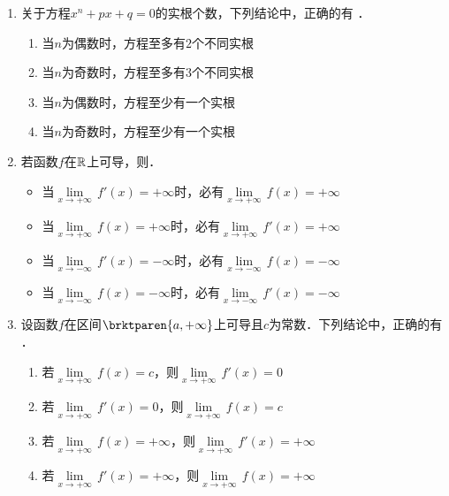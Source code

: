 \documentclass[a4paper,punct=CCT]{ctexbook}
\renewcommand*{\enumparen}[1]{（\makebox[0.6em][c]{\normalfont#1}）}
\theoremstyle{definition}
\theoremstyle{remark}
\newif\ifshowsol
\begin{document}
\begin{enumerate}
\item 关于方程\(x^n + px + q = 0\)的实根个数，下列结论中，正确的有\ifshowsol
  \uline{\makebox[6em]{\enumparen{1}\enumparen{2}\enumparen{4}}}．
  \else
  \uline{\hspace{6em}}．
  \fi
  \begin{enumerate}
    \renewcommand{\labelenumii}{\enumparen{\arabic{enumii}}}
  \item 当\(n\)为偶数时，方程至多有\(2\)个不同实根
  \item 当\(n\)为奇数时，方程至多有\(3\)个不同实根
  \item 当\(n\)为偶数时，方程至少有一个实根
  \item 当\(n\)为奇数时，方程至少有一个实根
  \end{enumerate}

\item 若函数\(f\)在\(\mathbb{R}\)上可导，则\uline{\hspace{10em}}．
  \begin{itemize}
    \renewcommand{\labelitemi}{\faCircleThin}
    \ifshowsol
  \item[\faCircle]
    \else
  \item
    \fi
    当\(\!\lim\limits_{x\to+\infty}\,f'(x) = +\infty\)时，必有\(\!\lim\limits_{x\to+\infty}\,f(x) = +\infty\)
  \item 当\(\!\lim\limits_{x\to+\infty}\,f(x) = +\infty\)时，必有\(\!\lim\limits_{x\to+\infty}\,f'(x) = +\infty\)
  \item 当\(\!\lim\limits_{x\to-\infty}\,f'(x) = -\infty\)时，必有\(\!\lim\limits_{x\to-\infty}\,f(x) = -\infty\)
  \item 当\(\!\lim\limits_{x\to-\infty}\,f(x) = -\infty\)时，必有\(\!\lim\limits_{x\to-\infty}\,f'(x) = -\infty\)
  \end{itemize}

\item 设函数\(f\)在区间\(\brktparen{a,+\infty}\)上可导且\(c\)为常数．下列结论中，正确的有\ifshowsol
  \uline{\makebox[6em]{\enumparen{4}}}．
  \else
  \uline{\hspace{6em}}．
  \fi
  \begin{enumerate}
    \renewcommand{\labelenumii}{\enumparen{\arabic{enumii}}}
  \item 若\(\!\lim\limits_{x\to+\infty}\,f(x) = c\)，则\(\!\lim\limits_{x\to+\infty}\,f'(x) = 0\)
  \item 若\(\!\lim\limits_{x\to+\infty}\,f'(x) = 0\)，则\(\!\lim\limits_{x\to+\infty}\,f(x) = c\)
  \item 若\(\!\lim\limits_{x\to+\infty}\,f(x) = +\infty\)，则\(\!\lim\limits_{x\to+\infty}\,f'(x) = +\infty\)
  \item 若\(\!\lim\limits_{x\to+\infty}\,f'(x) = +\infty\)，则\(\!\lim\limits_{x\to+\infty}\,f(x) = +\infty\)
  \end{enumerate}


\end{enumerate}
\end{document}

